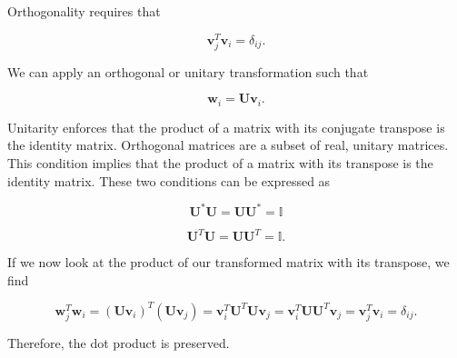 \documentclass[%
oneside,                 %
final,                   %
10pt]{article}
\begin{document}
Orthogonality requires that 

\[
\mathbf{v}_j^T\mathbf{v}_i = \delta_{ij}.
\]

We can apply an orthogonal or unitary transformation such that

\[
\mathbf{w}_i=\mathbf{U}\mathbf{v}_i.
\]

Unitarity enforces that the product of a matrix with its conjugate transpose is the identity matrix.  Orthogonal matrices are a subset of real, unitary matrices.  This condition implies that the product of a matrix with its transpose is the identity matrix.  These two conditions can be expressed as

\[
\mathbf{U}^* \mathbf{U} = \mathbf{U} \mathbf{U}^* = \mathbb{I}
\]

\[
\mathbf{U}^T \mathbf{U} = \mathbf{U} \mathbf{U}^T = \mathbb{I}.
\]

If we now look at the product of our transformed matrix with its transpose, we find

\[
\mathbf{w}^T_j\mathbf{w}_i = (\mathbf{U}\mathbf{v}_i)^T(\mathbf{U}\mathbf{v}_j)= \mathbf{v}_i^T\mathbf{U}^T\mathbf{U}\mathbf{v}_j=\mathbf{v}_i^T\mathbf{U}\mathbf{U}^T\mathbf{v}_j =\mathbf{v}_j^T\mathbf{v}_i = \delta_{ij}.
\]

Therefore, the dot product is preserved.

\end{document}
